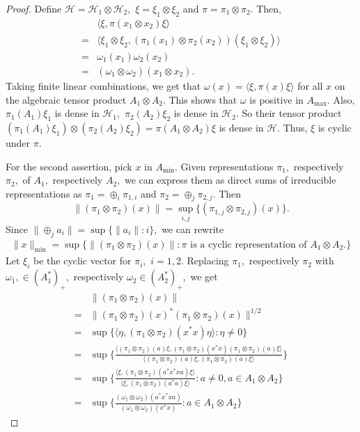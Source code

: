\documentclass{article}
\theoremstyle{plain}
\theoremstyle{definition}
\theoremstyle{remark}
\begin{document}
\begin{proof}
	Define $\mathcal{H} = \mathcal{H}_1 \otimes \mathcal{H}_2,$ $\xi = \xi_1 \otimes \xi_2$ and $\pi = \pi_1 \otimes
	\pi_2.$ Then,
\begin{align*}
	& \langle\xi, \pi(x_1 \otimes x_2) \xi\rangle \\
	={}& \langle\xi_1 \otimes \xi_2, ( \pi_1(x_1) \otimes \pi_2(x_2) ) (\xi_1 \otimes \xi_2) \rangle \\
	={}& \omega_1(x_1) \omega_2(x_2) \\
	={}& (\omega_1 \otimes \omega_2) (x_1 \otimes x_2) .
\end{align*}
Taking finite linear combinations, we get that $\omega(x) = \langle \xi, \pi(x) \xi\rangle$ for all $x$ on the algebraic
tensor product $A_1 \otimes A_2.$ This shows that $\omega$ is positive in $A_{\max}.$ Also, $\pi_1(A_1) \xi_1$
is dense in $\mathcal{H}_1,$ $\pi_2(A_2) \xi_2$ is dense in $\mathcal{H}_2.$ So their tensor product $(\pi_1(A_1) \xi_1 )
\otimes (\pi_2(A_2) \xi_2) = \pi(A_1 \otimes A_2) \xi$ is dense in $\mathcal{H}.$ Thus, $\xi$ is cyclic under $\pi.$

For the second assertion, pick $x$ in $A_{\min}.$ Given representations $\pi_1,$ respectively $\pi_2,$
of $A_1,$ respectively $A_2,$ we can express them as direct sums of irreducible representations as
$\pi_1 = \oplus_i \pi_{1,i}$ and $\pi_2 = \oplus_{j} \pi_{2,j}.$
Then
$$\lVert (\pi_1 \otimes \pi_2)(x) \rVert
= \sup_{i,j} \{ (\pi_{1,j} \otimes \pi_{2,j} ) (x) \}.$$
Since $\lVert \oplus_{j} a_i \rVert = \sup \{ \lVert a_i \rVert \colon i \},$
we can rewrite
\begin{align*}
	{} \lVert x \rVert_{\min} 
	={} \sup \{ \lVert (\pi_1 \otimes \pi_2) (x) \rVert \colon
\pi \text{ is a cyclic representation of } A_1 \otimes A_2. \}
\end{align*}
Let $\xi_i$ be the cyclic vector for $\pi_i,$ $i=1,2.$
Replacing $\pi_1,$ respectively $\pi_2$ with $\omega_1, \in (A_1^\ast)_+,$ respectively $\omega_2
\in (A_2^\ast)_+,$ we get
\begin{align*}
	& \lVert (\pi_1 \otimes \pi_2)(x) \rVert \\
	={}& \lVert (\pi_1 \otimes \pi_2)(x)^\ast (\pi_1 \otimes \pi_2)(x) \rVert^{1/2} \\
	={}& \sup\{ \langle \eta, (\pi_1 \otimes \pi_2) ( x^\ast x) \eta\rangle \colon \eta \not = 0 \} \\
	={}& \sup\{ \frac{ \langle(\pi_1 \otimes \pi_2) (a) \xi, (\pi_1 \otimes \pi_2)(x^\ast x) (\pi_1 \otimes \pi_2)(a) \xi \rangle }
	{\langle (\pi_1 \otimes \pi_2) (a) \xi, (\pi_1 \otimes \pi_2)(a) \xi \rangle} \} \\
	={}& \sup \{ \frac{\langle \xi, (\pi_1 \otimes \pi_2) ( a^\ast x^\ast x a) \xi \rangle}
	{\langle\xi, (\pi_1 \otimes \pi_2)(a^\ast a) \xi \rangle} \colon a \not = 0, a \in A_1 \otimes A_2 \} \\
	={}& \sup \{ \frac{(\omega_1 \otimes \omega_2) ( a^\ast x^\ast x a) }
	{(\omega_1 \otimes \omega_2)(x^\ast x)} \colon a \in A_1 \otimes A_2 \}
\end{align*}
\end{proof}
\end{document}
